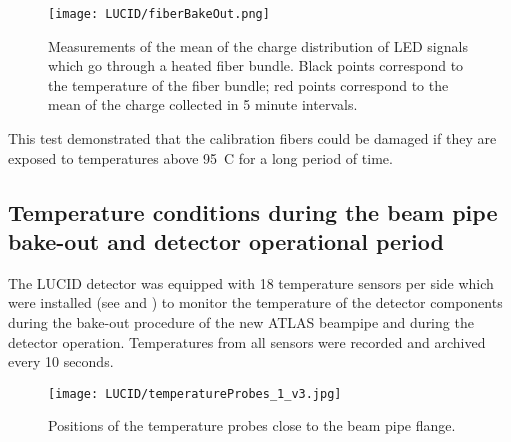 \begin{figure}
\centering
\texttt{[image: LUCID/fiberBakeOut.png]}
\caption{Measurements of the mean of the charge distribution of LED signals which go through a heated fiber bundle.
Black points correspond to the temperature of the fiber bundle; red points correspond to the mean of the charge collected in 5 minute intervals.}
\label{fig:fiberBakeOut}
\end{figure}

This test demonstrated that the calibration fibers could be damaged if they are exposed 
to temperatures above 95\degree~C for a long period of time.
% 
% 
 
\subsection{Temperature conditions during the beam pipe bake-out and detector operational period}

The LUCID detector was equipped with 18 temperature sensors per side which were installed (see 
and )
to monitor the temperature of the detector components during the bake-out procedure of the new ATLAS beampipe and during the detector operation.
Temperatures from all sensors were recorded and archived every 10 seconds.

\begin{figure}
\centering
\texttt{[image: LUCID/temperatureProbes\_1\_v3.jpg]}
\caption{Positions of the temperature probes close to the beam pipe flange.}
\label{fig:TempProbes1}
\end{figure}

